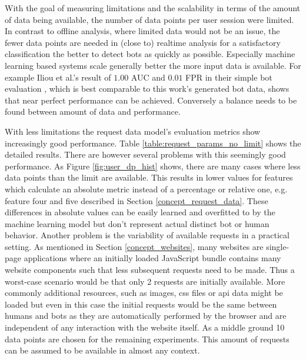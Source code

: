 \documentclass[
    fontsize=12pt,
    headings=small,
    parskip=half,           %
    bibliography=totoc,
    numbers=noenddot,       %
    open=any,               %
    final,                   %
    table
]{scrreprt}
\begin{document}

With the goal of measuring limitations and the scalability in terms of the amount of data being available, the number of data points per user session were limited. In contrast to offline analysis, where limited data would not be an issue, the fewer data points are needed in (close to) realtime analysis for a satisfactory classification the better to detect bots as quickly as possible. Especially machine learning based systems scale generally better the more input data is available. For example Iliou et al.'s result of $1.00$ AUC and $0.01$ FPR in their simple bot evaluation \cite{10.1145/3339252.3339267}, which is best comparable to this work's generated bot data, shows that near perfect performance can be achieved. Conversely a balance needs to be found between amount of data and performance.

With less limitations the request data model's evaluation metrics show increasingly good performance. Table \ref{table:request_params_no_limit} shows the detailed results. There are however several problems with this seemingly good performance. As Figure \ref{fig:user_dp_hist} shows, there are many cases where less data points than the limit are available. This results in lower values for features which calculate an absolute metric instead of a percentage or relative one, e.g. feature four and five described in Section \ref{concept_request_data}. These differences in absolute values can be easily learned and overfitted to by the machine learning model but don't represent actual distinct bot or human behavior.
Another problem is the variability of available requests in a practical setting. As mentioned in Section \ref{concept_websites}, many websites are single-page applications where an initially loaded JavaScript bundle contains many website components such that less subsequent requests need to be made. Thus a worst-case scenario would be that only 2 requests are initially available. More commonly additional resources, such as images, css files or api data might be loaded but even in this case the initial requests would be the same between humans and bots as they are automatically performed by the browser and are independent of any interaction with the website itself. As a middle ground 10 data points are chosen for the remaining experiments. This amount of requests can be assumed to be available in almost any context.
\end{document}
